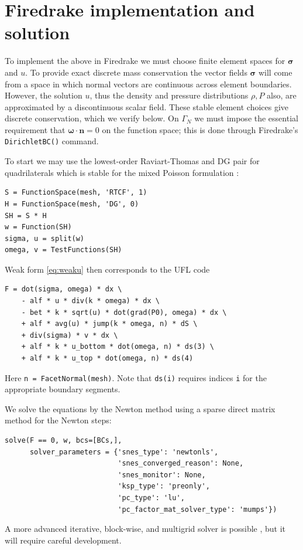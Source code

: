 \documentclass[11pt]{amsart}
\newcommand{\bn}{\mathbf{n}}
\newcommand{\bsigma}{\bm{\sigma}}
\newcommand{\bomega}{\bm{\omega}}
\begin{document}
\section{Firedrake implementation and solution}

To implement the above in Firedrake we must choose finite element spaces for $\bsigma$ and $u$.  To provide exact discrete mass conservation the vector fields $\bsigma$ will come from a space in which normal vectors are continuous across element boundaries.  However, the solution $u$, thus the density and pressure distributions $\rho,P$ also, are approximated by a discontinuous scalar field.  These stable element choices give discrete conservation, which we verify below.  On $\Gamma_N$ we must impose the essential requirement that $\bomega\cdot \bn=0$ on the function space; this is done through Firedrake's \verb|DirichletBC()| command.

To start we may use the lowest-order Raviart-Thomas and DG pair for quadrilaterals which is stable for the mixed Poisson formulation \citep{Arnold2018}:
\begin{Verbatim}[fontsize=\small,frame=lines]
S = FunctionSpace(mesh, 'RTCF', 1)
H = FunctionSpace(mesh, 'DG', 0)
SH = S * H
w = Function(SH)
sigma, u = split(w)
omega, v = TestFunctions(SH)
\end{Verbatim}
Weak form \eqref{eq:weaku} then corresponds to the UFL code
\begin{Verbatim}[fontsize=\small,frame=lines]
F = dot(sigma, omega) * dx \
    - alf * u * div(k * omega) * dx \
    - bet * k * sqrt(u) * dot(grad(P0), omega) * dx \
    + alf * avg(u) * jump(k * omega, n) * dS \
    + div(sigma) * v * dx \
    + alf * k * u_bottom * dot(omega, n) * ds(3) \
    + alf * k * u_top * dot(omega, n) * ds(4)
\end{Verbatim}
Here \verb|n = FacetNormal(mesh)|.  Note that \verb|ds(i)| requires indices \verb|i| for the appropriate boundary segments.

We solve the equations by the Newton method using a sparse direct matrix method \citep{Amestoy2001} for the Newton steps:
\begin{Verbatim}[fontsize=\small,frame=lines]
solve(F == 0, w, bcs=[BCs,],
      solver_parameters = {'snes_type': 'newtonls',
                           'snes_converged_reason': None,
                           'snes_monitor': None,
                           'ksp_type': 'preonly',
                           'pc_type': 'lu',
                           'pc_factor_mat_solver_type': 'mumps'})
\end{Verbatim}
A more advanced iterative, block-wise, and multigrid solver is possible \citep[e.g.][]{Bueler2021}, but it will require careful development.
\end{document}
